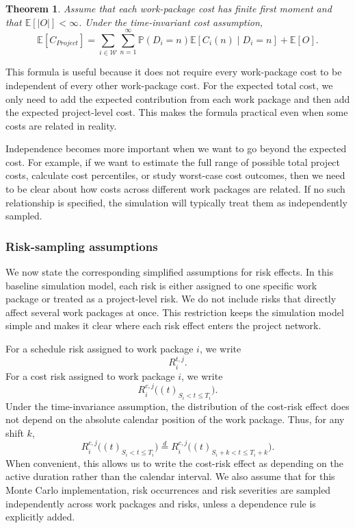 \documentclass[11pt,a4paper]{article}
\providecommand{\E}{\mathbb{E}}
\newcommand{\cW}{\mathcal{W}}
\newcommand{\pP}{\mathbb{P}}
\newcommand{\E}{\mathbb{E}}
\newcommand{\1}{\mathbf{1}}
\theoremstyle{definition}
\theoremstyle{plain}
\newtheorem{theorem}{Theorem}[section]
\theoremstyle{remark}
\numberwithin{equation}{section}
\begin{document}
\begin{theorem}
Assume that each work-package cost has finite first moment and that $\E[|O|]<\infty$. Under the time-invariant cost assumption,
\[
\E[C_{Project}]
=
\sum_{i\in\cW}
\sum_{n=1}^{\infty}
\pP(D_i=n)
\E\left[
C_i(n)
\mid
D_i=n
\right]
+
\E[O].
\]
\end{theorem}

This formula is useful because it does not require every work-package cost to be independent of every other work-package cost. For the expected total cost, we only need to add the expected contribution from each work package and then add the expected project-level cost. This makes the formula practical even when some costs are related in reality.

Independence becomes more important when we want to go beyond the expected cost. For example, if we want to estimate the full range of possible total project costs, calculate cost percentiles, or study worst-case cost outcomes, then we need to be clear about how costs across different work packages are related. If no such relationship is specified, the simulation will typically treat them as independently sampled.

\subsubsection{Risk-sampling assumptions}

We now state the corresponding simplified assumptions for risk effects. In this baseline simulation model, each risk is either assigned to one specific work package or treated as a project-level risk. We do not include risks that directly affect several work packages at once. This restriction keeps the simulation model simple and makes it clear where each risk effect enters the project network.

For a schedule risk assigned to work package $i$, we write
\[
R_i^{t,j}.
\]
For a cost risk assigned to work package $i$, we write
\[
R_i^{c,j}\bigl((t)_{S_i<t\leq T_i}\bigr).
\]
Under the time-invariance assumption, the distribution of the cost-risk effect does not depend on the absolute calendar position of the work package. Thus, for any shift $k$,
\[
R_i^{c,j}\bigl((t)_{S_i<t\leq T_i}\bigr)
\overset{d}{=}
R_i^{c,j}\bigl((t)_{S_i+k<t\leq T_i+k}\bigr).
\]
When convenient, this allows us to write the cost-risk effect as depending on the active duration rather than the calendar interval. We also assume that for this Monte Carlo implementation, risk occurrences and risk severities are sampled independently across work packages and risks, unless a dependence rule is explicitly added. 
\end{document}
